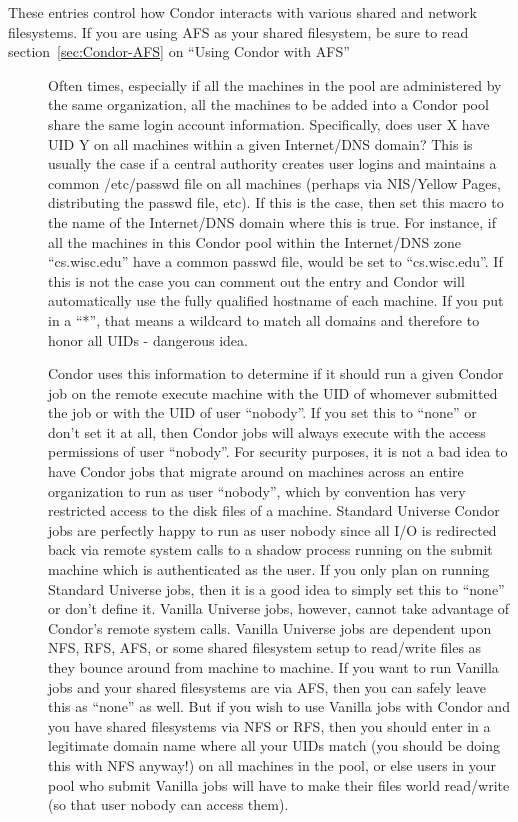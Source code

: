 These entries control how Condor interacts with various shared and
network filesystems.  If you are using AFS as your shared filesystem,
be sure to read section~\ref{sec:Condor-AFS} on ``Using Condor with
AFS''
\begin{description}

\item[] \label{param:UidDomain} Often times,
  especially if all the machines in the pool are administered by the
  same organization, all the machines to be added into a Condor pool
  share the same login account information.  Specifically, does user X
  have UID Y on all machines within a given Internet/DNS domain? This
  is usually the case if a central authority creates user logins and
  maintains a common /etc/passwd file on all machines (perhaps via
  NIS/Yellow Pages, distributing the passwd file, etc). If this is the
  case, then set this macro to the name of the Internet/DNS domain
  where this is true. For instance, if all the machines in this Condor
  pool within the Internet/DNS zone ``cs.wisc.edu'' have a common
  passwd file,  would be set to ``cs.wisc.edu''. If
  this is not the case you can comment out the entry and Condor will
  automatically use the fully qualified hostname of each machine.  If
  you put in a ``*'', that means a wildcard to match all domains and
  therefore to honor all UIDs - dangerous idea.
          
  Condor uses this information to determine if it should run a given
  Condor job on the remote execute machine with the UID of whomever
  submitted the job or with the UID of user ``nobody''.  If you set
  this to ``none'' or don't set it at all, then Condor jobs will
  always execute with the access permissions of user ``nobody''.  For
  security purposes, it is not a bad idea to have Condor jobs that
  migrate around on machines across an entire organization to run as
  user ``nobody'', which by convention has very restricted access to
  the disk files of a machine.  Standard Universe Condor jobs are
  perfectly happy to run as user nobody since all I/O is redirected
  back via remote system calls to a shadow process running on the
  submit machine which is authenticated as the user.  If you only plan
  on running Standard Universe jobs, then it is a good idea to simply
  set this to ``none'' or don't define it.  Vanilla Universe jobs,
  however, cannot take advantage of Condor's remote system calls.
  Vanilla Universe jobs are dependent upon NFS, RFS, AFS, or some
  shared filesystem setup to read/write files as they bounce around
  from machine to machine. If you want to run Vanilla jobs and your
  shared filesystems are via AFS, then you can safely leave this as
  ``none'' as well. But if you wish to use Vanilla jobs with Condor
  and you have shared filesystems via NFS or RFS, then you should
  enter in a legitimate domain name where all your UIDs match (you
  should be doing this with NFS anyway!) on all machines in the pool,
  or else users in your pool who submit Vanilla jobs will have to make
  their files world read/write (so that user nobody can access them).
          

\end{description}
